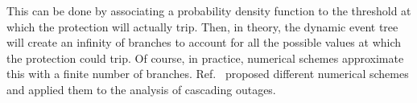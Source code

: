 
This can be done by associating a probability density function to the threshold at which the protection will actually trip. Then, in theory, the dynamic event tree will create an infinity of branches to account for all the possible values at which the protection could trip. Of course, in practice, numerical schemes approximate this with a finite number of branches. Ref.~\cite{TwoLevelPSA, Faghihi, PierreMCDETprelim} proposed different numerical schemes and applied them to the analysis of cascading outages.


